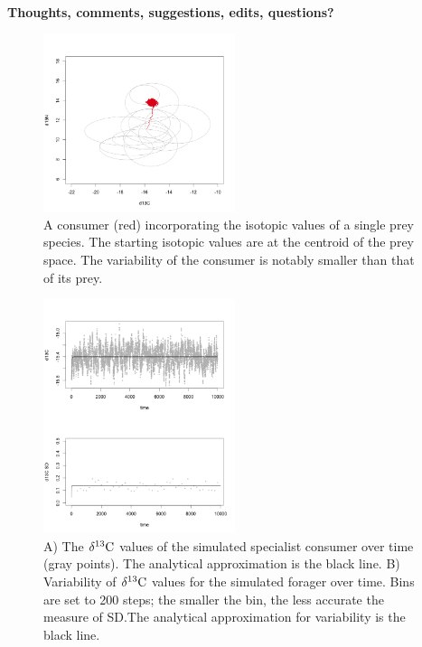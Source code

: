 \documentclass[11pt]{article}
\begin{document}
{\bf Thoughts, comments, suggestions, edits, questions?}


\begin{figure}[h!]
   \centering
   \includegraphics[width=0.5\textwidth]{fig_bivariate.png}
      \caption{
      A consumer (red) incorporating the isotopic values of a single prey species. The starting isotopic values are at the centroid of the prey space. The variability of the consumer is notably smaller than that of its prey.
      }
      \label{fig_bivariate}
\end{figure}

\begin{figure}[h!]
   \centering
   \includegraphics[width=0.5\textwidth]{fig_d13CvsTime.png}
      \caption{
      A) The $\delta^{13}{\rm C}$ values of the simulated specialist consumer over time (gray points). The analytical approximation is the black line.
      B) Variability of $\delta^{13}{\rm C}$ values for the simulated forager over time. Bins are set to 200 steps; the smaller the bin, the less accurate the measure of SD.The analytical approximation for variability is the black line.
      }
      \label{fig_time}
\end{figure}
\end{document}
